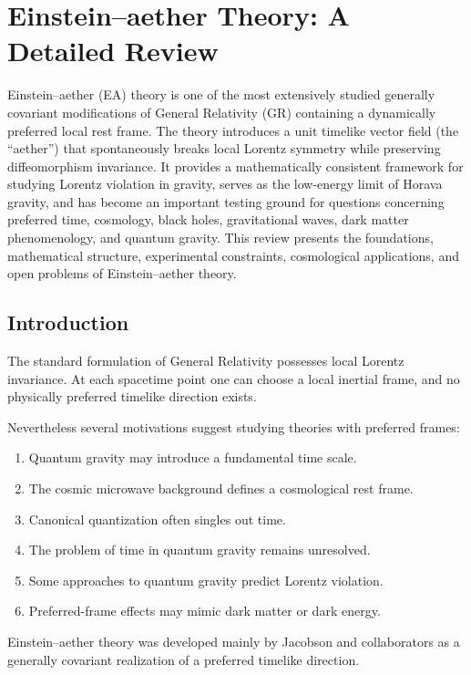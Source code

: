 \chapter{Einstein--aether Theory: A Detailed Review}
Einstein--aether (EA) theory is one of the most extensively studied
generally covariant modifications of General Relativity (GR) containing
a dynamically preferred local rest frame.
The theory introduces a unit timelike vector field
(the ``aether'') that spontaneously breaks local Lorentz symmetry
while preserving diffeomorphism invariance.
It provides a mathematically consistent framework for studying
Lorentz violation in gravity, serves as the low-energy limit of
Horava gravity, and has become an important testing ground for
questions concerning preferred time, cosmology, black holes,
gravitational waves, dark matter phenomenology, and quantum gravity.
This review presents the foundations, mathematical structure,
experimental constraints, cosmological applications, and open problems
of Einstein--aether theory.

\section{Introduction}

The standard formulation of General Relativity possesses
local Lorentz invariance.
At each spacetime point one can choose a local inertial frame,
and no physically preferred timelike direction exists.

Nevertheless several motivations suggest studying theories with
preferred frames:

\begin{enumerate}
\item Quantum gravity may introduce a fundamental time scale.
\item The cosmic microwave background defines a cosmological rest frame.
\item Canonical quantization often singles out time.
\item The problem of time in quantum gravity remains unresolved.
\item Some approaches to quantum gravity predict Lorentz violation.
\item Preferred-frame effects may mimic dark matter or dark energy.
\end{enumerate}

Einstein--aether theory was developed mainly by  Jacobson
and collaborators as a generally covariant realization of a preferred
timelike direction.

